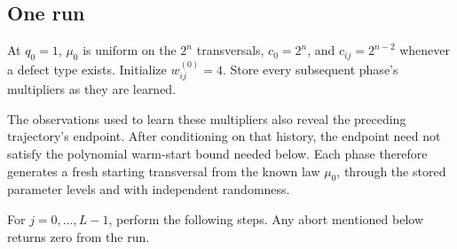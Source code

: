 \documentclass[11pt]{article}
\theoremstyle{definition}
\begin{document}
\subsection{One run}

At $q_0=1$, $\mu_0$ is uniform on the $2^n$ transversals, $c_0=2^n$,
and $c_{ij}=2^{n-2}$ whenever a defect type exists.  Initialize
$w^{(0)}_{ij}=4$.  Store every subsequent phase's multipliers as they
are learned.

The observations used to learn these multipliers also reveal the
preceding trajectory's endpoint.  After conditioning on that history,
the endpoint need not satisfy the polynomial warm-start bound needed
below.  Each phase therefore generates a fresh starting transversal
from the known law $\mu_0$, through the stored parameter levels and with
independent randomness.

For $j=0,\ldots,L-1$, perform the following steps.  Any abort mentioned
below returns zero from the run.
\end{document}
